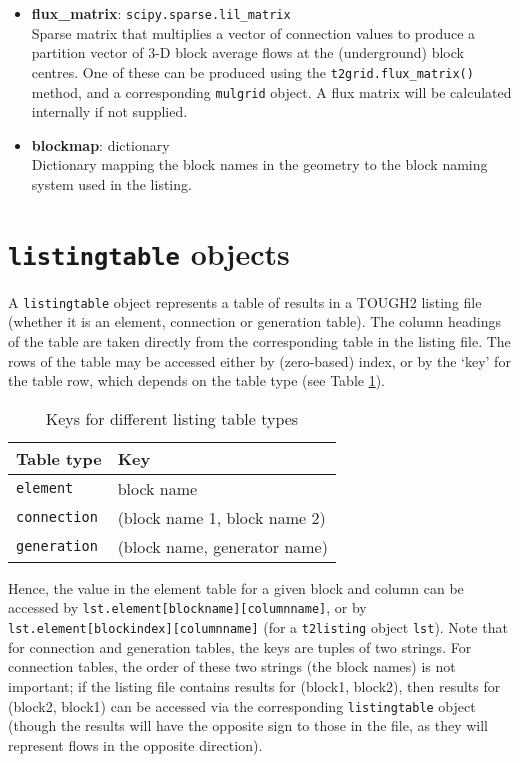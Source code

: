 \begin{itemize}
\item \textbf{flux\_matrix}: \texttt{scipy.sparse.lil\_matrix}\\
  Sparse matrix that multiplies a vector of connection values to produce a partition vector of 3-D block average flows at the (underground) block centres.  One of these can be produced using the \texttt{t2grid.flux\_matrix()} method, and a corresponding \texttt{mulgrid} object.  A flux matrix will be calculated internally if not supplied.
\item \textbf{blockmap}: dictionary\\
  Dictionary mapping the block names in the geometry to the block naming system used in the listing.
\end{itemize}

\section{\texttt{listingtable} objects}
\label{listingtableobjects}

A \texttt{listingtable} object represents a table of results in a TOUGH2 listing file (whether it is an element, connection or generation table).  The column headings of the table are taken directly from the corresponding table in the listing file.  The rows of the table may be accessed either by (zero-based) index, or by the `key' for the table row, which depends on the table type (see Table \ref{tb:listing_table_keys}).

\begin{table}[h]
  \begin{center}
    \begin{tabular}{|l|l|}
      \hline
      \textbf{Table type} & \textbf{Key}\\
      \hline
      \texttt{element} & block name\\
      \texttt{connection} & (block name 1, block name 2)\\
      \texttt{generation} & (block name, generator name)\\
      \hline
    \end{tabular}
    \caption{Keys for different listing table types}
    \label{tb:listing_table_keys}
  \end{center}
\end{table}

Hence, the value in the element table for a given block and column can be accessed by \texttt{lst.element[blockname][columnname]}, or by \texttt{lst.element[blockindex][columnname]} (for a \texttt{t2listing} object \texttt{lst}).  Note that for connection and generation tables, the keys are tuples of two strings.  For connection tables, the order of these two strings (the block names) is not important; if the listing file contains results for (block1, block2), then results for (block2, block1) can be accessed via the corresponding \texttt{listingtable} object (though the results will have the opposite sign to those in the file, as they will represent flows in the opposite direction).

